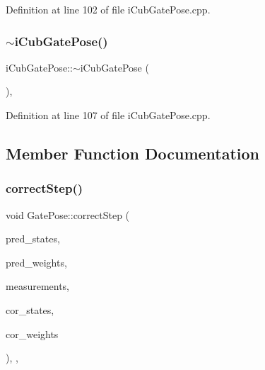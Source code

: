 Definition at line 102 of file i\+Cub\+Gate\+Pose.\+cpp.

\mbox{\label{classiCubGatePose_a4c1d13f972ab4b9c778982964dae768d}} 
\subsubsection{\texorpdfstring{$\sim$i\+Cub\+Gate\+Pose()}{~iCubGatePose()}}
{\footnotesize\ttfamily i\+Cub\+Gate\+Pose\+::$\sim$i\+Cub\+Gate\+Pose (\begin{DoxyParamCaption}{ }\end{DoxyParamCaption})\hspace{0.3cm}{\ttfamily [override]}, {\ttfamily [noexcept]}}



Definition at line 107 of file i\+Cub\+Gate\+Pose.\+cpp.



\subsection{Member Function Documentation}
\mbox{\label{classGatePose_a91d395abe75dc7772116f50219dc19ae}} 
\subsubsection{\texorpdfstring{correct\+Step()}{correctStep()}}
{\footnotesize\ttfamily void Gate\+Pose\+::correct\+Step (\begin{DoxyParamCaption}\item[{const Eigen\+::\+Ref$<$ const Eigen\+::\+Matrix\+Xf $>$ \&}]{pred\+\_\+states,  }\item[{const Eigen\+::\+Ref$<$ const Eigen\+::\+Vector\+Xf $>$ \&}]{pred\+\_\+weights,  }\item[{cv\+::\+Input\+Array}]{measurements,  }\item[{Eigen\+::\+Ref$<$ Eigen\+::\+Matrix\+Xf $>$}]{cor\+\_\+states,  }\item[{Eigen\+::\+Ref$<$ Eigen\+::\+Vector\+Xf $>$}]{cor\+\_\+weights }\end{DoxyParamCaption})\hspace{0.3cm}{\ttfamily [override]}, {\ttfamily [protected]}, {\ttfamily [inherited]}}



